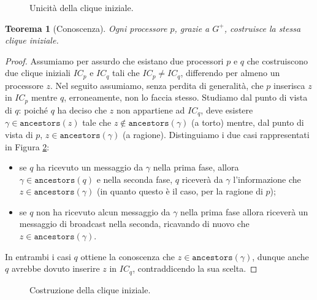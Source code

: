 \documentclass{article}
\newtheorem{teorema}{Teorema}
\begin{document}
\begin{figure}[!h]
  \centering \caption{Unicità della clique iniziale.}\label{fig:unicita}
\end{figure}

\begin{teorema}[Conoscenza]
\label{teorema:conoscenzaInitialClique}
  Ogni processore $p$, grazie a $G^+$, costruisce la stessa clique
  iniziale.
\end{teorema}
\begin{proof}
  Assumiamo per assurdo che esistano due processori $p$ e $q$ che
  costruiscono due clique iniziali $IC_p$ e $IC_q$ tali che $IC_p\neq
  IC_q$, differendo per almeno un processore $z$. Nel seguito
  assumiamo, senza perdita di generalità, che $p$ inserisca $z$ in
  $IC_p$ mentre $q$, erroneamente, non lo faccia stesso. Studiamo dal
  punto di vista di $q$: poiché $q$ ha deciso che $z$ non appartiene
  ad $IC_q$, deve esistere $\gamma \in \texttt{ancestors}(z)$ tale che
  $z \not \in \texttt{ancestors}(\gamma)$ (a torto) mentre, dal punto
  di vista di $p$, $z \in \texttt{ancestors}(\gamma)$ (a
  ragione). Distinguiamo i due casi rappresentati in Figura \ref{fig:conoscenza}:
\begin{itemize}
\item se $q$ ha ricevuto un messaggio da $\gamma$ nella prima fase,
  allora $\gamma \in \texttt{ancestors}(q)$ e nella seconda fase, $q$
  riceverà da $\gamma$ l'informazione che $z \in
  \texttt{ancestors}(\gamma)$ (in quanto questo è il caso, per la
  ragione di $p$);
\item se $q$ non ha ricevuto alcun messaggio da $\gamma$ nella prima
  fase allora riceverà un messaggio di broadcast nella seconda,
  ricavando di nuovo che $z \in \texttt{ancestors}(\gamma)$.
\end{itemize} 
In entrambi i casi $q$ ottiene la conoscenza che $z \in
\texttt{ancestors}(\gamma)$, dunque anche $q$ avrebbe dovuto inserire
$z$ in $IC_q$, contraddicendo la sua scelta.
\end{proof}

\begin{figure}[!h]
  \centering \caption{Costruzione della clique iniziale.}\label{fig:conoscenza}
\end{figure}
\end{document}
